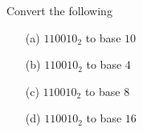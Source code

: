 Convert the following
\begin{enumerate}[label=\alph*.,nosep]
\item[(a)] $110010_2$ to base $10$	
\item[(b)] $110010_2$ to base $4$	
\item[(c)] $110010_2$ to base $8$	
\item[(d)] $110010_2$ to base $16$
\end{enumerate}
